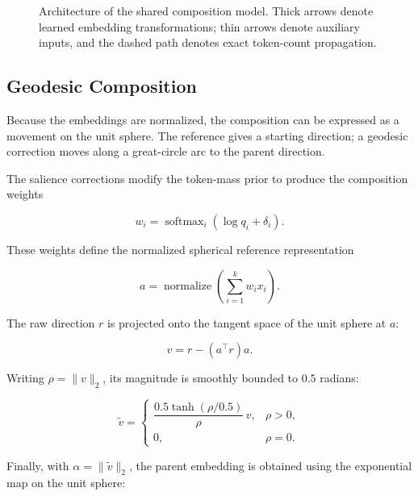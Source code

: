 \documentclass[10pt]{article}
\begin{document}
\begin{figure}[!t]
{%
}

\caption{Architecture of the shared composition model. Thick arrows denote learned embedding transformations; thin arrows denote auxiliary inputs, and the dashed path denotes exact token-count propagation.}
\label{fig:model-architecture}
\end{figure}

\subsection{Geodesic Composition}
\label{sec:geodesic}

Because the embeddings are normalized, the composition can be expressed as a
movement on the unit sphere. The reference gives a starting direction; a
geodesic correction moves along a great-circle arc to the parent direction.

The salience corrections modify the token-mass prior to produce the composition weights

\[
w_i=\operatorname{softmax}_i(\log q_i+\delta_i).
\]

These weights define the normalized spherical reference representation

\[
a=\operatorname{normalize}\!\left(\sum_{i=1}^{k}w_i x_i\right).
\]

The raw direction \(r\) is projected onto the tangent space of the unit sphere at \(a\):

\[
v=r-(a^\top r)a.
\]

Writing \(\rho=\lVert v\rVert_2\), its magnitude is smoothly bounded to \(0.5\) radians:

\[
\tilde v=
\begin{cases}
\dfrac{0.5\tanh(\rho/0.5)}{\rho}\,v,&\rho>0,\\[6pt]
0,&\rho=0.
\end{cases}
\]

Finally, with \(\alpha=\lVert\tilde v\rVert_2\), the parent embedding is obtained using the exponential map on the unit sphere:
\end{document}

